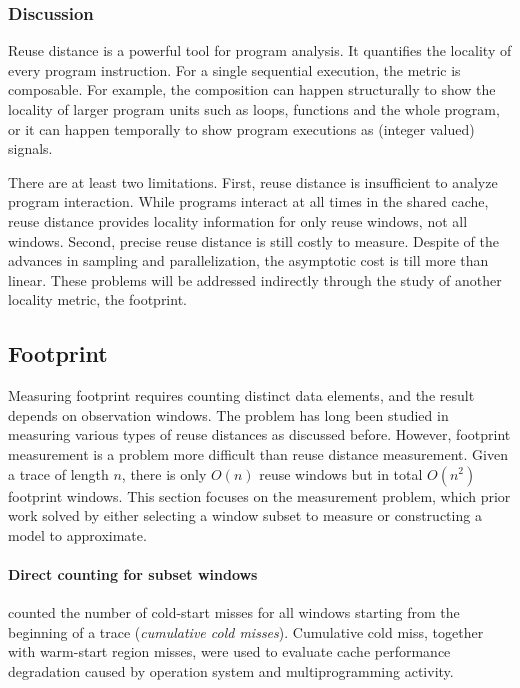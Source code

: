 \subsubsection{Discussion}

Reuse distance is a powerful tool for program analysis.  It quantifies
the locality of every program instruction.  For a single sequential
execution, the metric is composable.  For example, the composition can
happen structurally to show the locality of larger program units such
as loops, functions and the whole program, or it can happen temporally
to show program executions as (integer valued) signals.


There are at least two limitations.  First, reuse distance is
insufficient to analyze program interaction.  While programs interact
at all times in the shared cache, reuse distance provides locality
information for only reuse windows, not all windows.  Second, precise reuse
distance is still costly to measure.  Despite of the advances in sampling
and parallelization, the asymptotic cost is till more than linear.
These problems will be addressed indirectly through the study of
another locality metric, the footprint.


\subsection{Footprint}
\label{sec:back:fp}

Measuring footprint requires counting distinct data elements, and the
result depends on observation windows.  The problem has long been
studied in measuring various types of reuse distances as discussed
before. However, footprint measurement is a problem more difficult
than reuse distance measurement. Given a trace of length $n$, there is
only $O(n)$ reuse windows but in total $O(n^2)$ footprint windows.
This section focuses on the measurement problem, which prior work solved
by either selecting a window subset to measure or
constructing a model to approximate.


\paragraph{Direct counting for subset windows} 
\citet{Agarwal+:TOCS88} counted the number of cold-start misses for all windows
starting from the beginning of a trace ({\em cumulative cold misses}).  
Cumulative cold miss, together with warm-start region 
misses, were used to evaluate cache performance degradation
caused by operation system and multiprogramming activity. 

